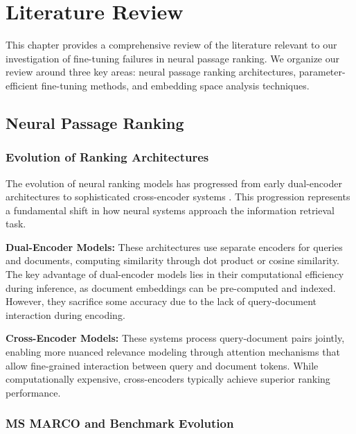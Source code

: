
\chapter{Literature Review} %

\label{Chapter2} %


This chapter provides a comprehensive review of the literature relevant to our investigation of fine-tuning failures in neural passage ranking. We organize our review around three key areas: neural passage ranking architectures, parameter-efficient fine-tuning methods, and embedding space analysis techniques.

\section{Neural Passage Ranking}

\subsection{Evolution of Ranking Architectures}

The evolution of neural ranking models has progressed from early dual-encoder architectures \cite{dong2022exploring} to sophisticated cross-encoder systems \cite{lu2025crossencoder, karpukhin2020dense}. This progression represents a fundamental shift in how neural systems approach the information retrieval task.

\textbf{Dual-Encoder Models:} These architectures use separate encoders for queries and documents, computing similarity through dot product or cosine similarity. The key advantage of dual-encoder models lies in their computational efficiency during inference, as document embeddings can be pre-computed and indexed. However, they sacrifice some accuracy due to the lack of query-document interaction during encoding.

\textbf{Cross-Encoder Models:} These systems process query-document pairs jointly, enabling more nuanced relevance modeling through attention mechanisms that allow fine-grained interaction between query and document tokens. While computationally expensive, cross-encoders typically achieve superior ranking performance.

\subsection{MS MARCO and Benchmark Evolution}

